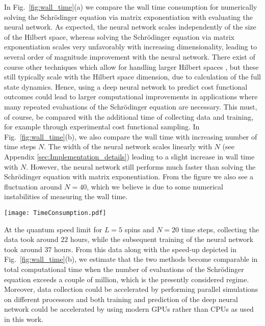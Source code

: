 \documentclass[aps, twocolumn,superscriptaddress]{revtex4-1}
\begin{document}
In Fig.~\ref{fig:wall_time}(a) we compare the wall time consumption for numerically solving the Schrödinger equation via matrix exponentiation with evaluating the neural network. As expected, the neural network scales independently of the size of the Hilbert space, whereas solving the Schrödinger equation via matrix exponentiation scales very unfavorably with increasing dimensionality, leading to several order of magnitude improvement with the neural network. There exist of course other techniques which allow for handling larger Hilbert spaces \cite{perez2006matrix,de2008density,orus2019tensor}, but these still typically scale with the Hilbert space dimension, due to calculation of the full state dynamics. Hence, using a deep neural network to predict cost functional outcomes could lead to larger computational improvements in applications where many repeated evaluations of the Schrödinger equation are necessary. This must, of course, be compared with the additional time of collecting data and training, for example through experimental cost functional sampling. In Fig.~\ref{fig:wall_time}(b), we also compare the wall time with increasing number of time steps $N$. The width of the neural network scales linearly with $N$ (see Appendix \ref{sec:Implementation_details}) leading to a slight increase in wall time with $N$. However, the neural network still performs much faster than solving the Schrödinger equation with matrix exponentiation. From the figure we also see a fluctuation around $N = 40$, which we believe is due to some numerical instabilities of measuring the wall time.

\begin{figure*}
    \centering
    \texttt{[image: TimeConsumption.pdf]}
    \caption{The wall time consumption for numerically solving the Schrödinger equation via matrix exponentiation and evaluating the deep neural network. Here each point corresponds to the evaluation of $1,000$ pulses. ($a$) The scaling with an increasing number of spins $L$. Here we obtain a very favorable scaling with the deep neural network, since its evaluation does not scale with the size of the Hilbert space ($d=2^L$). ($b$) The scaling with an increasing number of time steps $N$, which is also favorable to the deep neural network.  }
    \label{fig:wall_time}
\end{figure*}

At the quantum speed limit for $L = 5$ spins and $N = 20$ time steps, collecting the data took around $22$ hours, while the subsequent training of the neural network took around $37$ hours. From this data along with the speed-up depicted in Fig.~\ref{fig:wall_time}(b), we estimate that the two methods become comparable in total computational time when the number of evaluations of the Schrödinger equation exceeds a couple of million, which is the presently considered regime. Moreover, data collection could be accelerated by performing parallel simulations on different processors and both training and prediction of the deep neural network could be accelerated by using modern GPUs rather than CPUs as used in this work.
\end{document}
